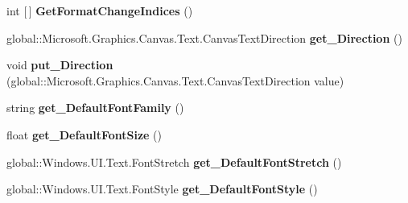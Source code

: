 \begin{DoxyCompactItemize}
\mbox{\label{interface_microsoft_1_1_graphics_1_1_canvas_1_1_text_1_1_i_canvas_text_layout_a73f2d2dac663dc66cf5846e351b3ecb5}} 
int \mbox{[}$\,$\mbox{]} {\bfseries Get\+Format\+Change\+Indices} ()
\item 
\mbox{\label{interface_microsoft_1_1_graphics_1_1_canvas_1_1_text_1_1_i_canvas_text_layout_adcf04927cfc8f87ca62aed637107ecc8}} 
global\+::\+Microsoft.\+Graphics.\+Canvas.\+Text.\+Canvas\+Text\+Direction {\bfseries get\+\_\+\+Direction} ()
\item 
\mbox{\label{interface_microsoft_1_1_graphics_1_1_canvas_1_1_text_1_1_i_canvas_text_layout_a7e880bd0b063a9b01869580d1fa1dc3a}} 
void {\bfseries put\+\_\+\+Direction} (global\+::\+Microsoft.\+Graphics.\+Canvas.\+Text.\+Canvas\+Text\+Direction value)
\item 
\mbox{\label{interface_microsoft_1_1_graphics_1_1_canvas_1_1_text_1_1_i_canvas_text_layout_ae9a3d34571d57d80cd0bf928ae229311}} 
string {\bfseries get\+\_\+\+Default\+Font\+Family} ()
\item 
\mbox{\label{interface_microsoft_1_1_graphics_1_1_canvas_1_1_text_1_1_i_canvas_text_layout_a100786b18511c24b2f14c20333076955}} 
float {\bfseries get\+\_\+\+Default\+Font\+Size} ()
\item 
\mbox{\label{interface_microsoft_1_1_graphics_1_1_canvas_1_1_text_1_1_i_canvas_text_layout_ac1457e535065d68c28f8fd91ef9aa307}} 
global\+::\+Windows.\+U\+I.\+Text.\+Font\+Stretch {\bfseries get\+\_\+\+Default\+Font\+Stretch} ()
\item 
\mbox{\label{interface_microsoft_1_1_graphics_1_1_canvas_1_1_text_1_1_i_canvas_text_layout_a0cdf7a178c8aa5fec6b520cddcb9cce4}} 
global\+::\+Windows.\+U\+I.\+Text.\+Font\+Style {\bfseries get\+\_\+\+Default\+Font\+Style} ()

\end{DoxyCompactItemize}
